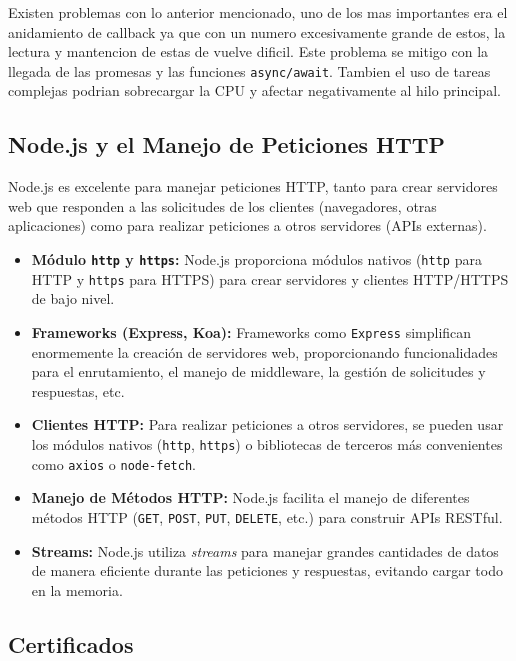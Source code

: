 \documentclass[a4paper, 12pt]{book}
\begin{document}
Existen problemas con lo anterior mencionado, uno de los mas importantes era el anidamiento de callback ya que con un numero excesivamente grande de estos, la lectura y mantencion de estas de vuelve dificil. Este problema se mitigo con la llegada de las promesas y las funciones \texttt{async/await}. Tambien el uso de tareas complejas podrian sobrecargar la CPU y afectar negativamente al hilo principal. 

\subsection{Node.js y el Manejo de Peticiones HTTP} 

Node.js es excelente para manejar peticiones HTTP, tanto para crear servidores web que responden a las solicitudes de los clientes (navegadores, otras aplicaciones) como para realizar peticiones a otros servidores (APIs externas).

\begin{itemize}
  \item \textbf{Módulo \texttt{http} y \texttt{https}:} Node.js proporciona módulos nativos (\texttt{http} para HTTP y \texttt{https} para HTTPS) para crear servidores y clientes HTTP/HTTPS de bajo nivel.

  \item \textbf{Frameworks (Express, Koa):} Frameworks como \texttt{Express} simplifican enormemente la creación de servidores web, proporcionando funcionalidades para el enrutamiento, el manejo de middleware, la gestión de solicitudes y respuestas, etc.

  \item \textbf{Clientes HTTP:} Para realizar peticiones a otros servidores, se pueden usar los módulos nativos (\texttt{http}, \texttt{https}) o bibliotecas de terceros más convenientes como \texttt{axios} o \texttt{node-fetch}.

  \item \textbf{Manejo de Métodos HTTP:} Node.js facilita el manejo de diferentes métodos HTTP (\texttt{GET}, \texttt{POST}, \texttt{PUT}, \texttt{DELETE}, etc.) para construir APIs RESTful.

  \item \textbf{Streams:} Node.js utiliza \textit{streams} para manejar grandes cantidades de datos de manera eficiente durante las peticiones y respuestas, evitando cargar todo en la memoria.
\end{itemize}
\subsection{Certificados} 
\end{document}

